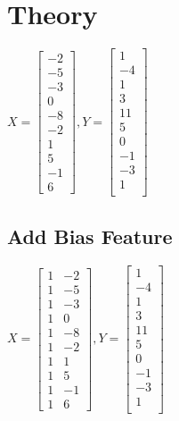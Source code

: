 \documentclass[12pt]{article}
\begin{document}
\maketitle


\section{Theory}
$X =
\begin{bmatrix}
	-2\\
	-5\\
	-3\\
	0\\
	-8\\
	-2\\
	1\\
	5\\
	-1\\
	6
\end{bmatrix},
Y = 
\begin{bmatrix}
	1\\
	-4\\	
	1\\
	3\\
	11\\
	5\\
	0\\
	-1\\
	-3\\
	1\\
\end{bmatrix}
$

\subsection{Add Bias Feature}
$X =
\begin{bmatrix}
	1 & -2\\
	1 & -5\\
	1 & -3\\
	1 & 0\\
	1 & -8\\
	1 & -2\\
	1 & 1\\
	1 & 5\\
	1 & -1\\
	1 & 6
\end{bmatrix},
Y = 
\begin{bmatrix}
	1\\
	-4\\	
	1\\
	3\\
	11\\
	5\\
	0\\
	-1\\
	-3\\
	1\\
\end{bmatrix}
$
\end{document}
